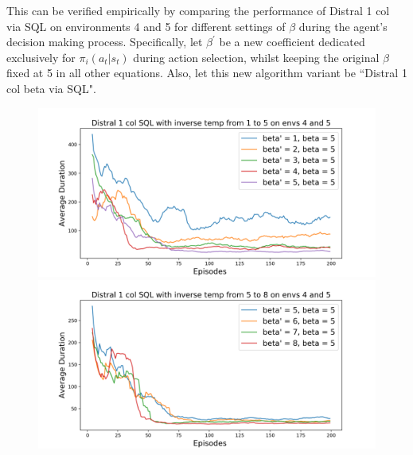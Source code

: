 \documentclass[12pt]{report}
\begin{document}
This can be verified empirically by comparing the performance of Distral 1 col via SQL on environments 4 and 5 for different settings of $\beta$ during the agent's decision making process. Specifically, let $\beta^\prime$ be a new coefficient dedicated exclusively for $\pi_i(a_t|s_t)$ during action selection, whilst keeping the original $\beta$ fixed at 5 in all other equations. Also, let this new algorithm variant be ``Distral 1 col beta via SQL".
\begin{figure}[H]
\centering
\begin{minipage}{.5\textwidth}
\centering
\includegraphics[width=\textwidth]{figs/betas/d1_SQL_1_to_5_b_avg_dur.png}
\end{minipage}%
\centering
\begin{minipage}{.5\textwidth}
\centering
\includegraphics[width=\textwidth]{figs/betas/d1_SQL_5_to_8_b_avg_dur.png}
\end{minipage}%
\end{figure}
\end{document}
